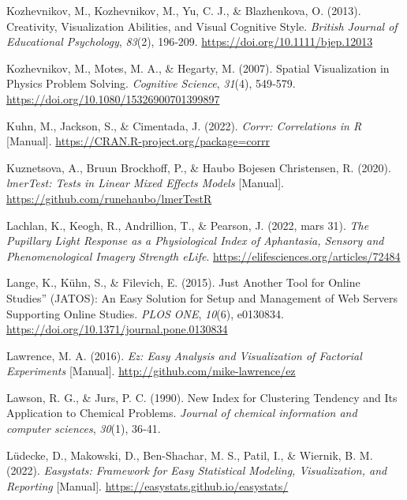 \documentclass[
  12pt,
]{article}
\newlength{\cslhangindent}
\newlength{\cslentryspacingunit} %
\newenvironment{CSLReferences}[2] %
 {%
  \setlength{\parindent}{0pt}
  \ifodd #1
  \let\oldpar\par
  \def\par{\hangindent=\cslhangindent\oldpar}
  \fi
  \setlength{\parskip}{#2\cslentryspacingunit}
 }%
 {}
\begin{document}
\begin{CSLReferences}{1}{0}
\leavevmode{}%
Kozhevnikov, M., Kozhevnikov, M., Yu, C. J., \& Blazhenkova, O. (2013).
Creativity, Visualization Abilities, and Visual Cognitive Style.
\emph{British Journal of Educational Psychology}, \emph{83}(2), 196‑209.
\url{https://doi.org/10.1111/bjep.12013}

\leavevmode{}%
Kozhevnikov, M., Motes, M. A., \& Hegarty, M. (2007). Spatial
{Visualization} in {Physics Problem Solving}. \emph{Cognitive Science},
\emph{31}(4), 549‑579. \url{https://doi.org/10.1080/15326900701399897}

\leavevmode{}%
Kuhn, M., Jackson, S., \& Cimentada, J. (2022). \emph{Corrr:
{Correlations} in {R}} {[}Manual{]}.
\url{https://CRAN.R-project.org/package=corrr}

\leavevmode{}%
Kuznetsova, A., Bruun Brockhoff, P., \& Haubo Bojesen Christensen, R.
(2020). \emph{{lmerTest}: {Tests} in Linear Mixed Effects Models}
{[}Manual{]}. \url{https://github.com/runehaubo/lmerTestR}

\leavevmode{}%
Lachlan, K., Keogh, R., Andrillion, T., \& Pearson, J. (2022, mars 31).
\emph{The Pupillary Light Response as a Physiological Index of
Aphantasia, Sensory and Phenomenological Imagery Strength \textbar{}
{eLife}}. \url{https://elifesciences.org/articles/72484}

\leavevmode{}%
Lange, K., Kühn, S., \& Filevich, E. (2015). {Just Another Tool} for
{Online Studies}'' ({JATOS}): {An Easy Solution} for {Setup} and
{Management} of {Web Servers Supporting Online Studies}. \emph{PLOS
ONE}, \emph{10}(6), e0130834.
\url{https://doi.org/10.1371/journal.pone.0130834}

\leavevmode{}%
Lawrence, M. A. (2016). \emph{Ez: {Easy} Analysis and Visualization of
Factorial Experiments} {[}Manual{]}.
\url{http://github.com/mike-lawrence/ez}

\leavevmode{}%
Lawson, R. G., \& Jurs, P. C. (1990). New Index for Clustering Tendency
and Its Application to Chemical Problems. \emph{Journal of chemical
information and computer sciences}, \emph{30}(1), 36‑41.

\leavevmode{}%
Lüdecke, D., Makowski, D., Ben-Shachar, M. S., Patil, I., \& Wiernik, B.
M. (2022). \emph{Easystats: {Framework} for Easy Statistical Modeling,
Visualization, and Reporting} {[}Manual{]}.
\url{https://easystats.github.io/easystats/}


\end{CSLReferences}
\end{document}
